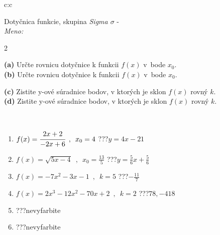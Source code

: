 \documentclass[10pt]{report}
\begin{document}
\begin{tabular}{c:c}
\begin{minipage}[c][104.5mm][t]{0.5\linewidth}
\begin{center}
\vspace{7mm}
{\huge Dotyčnica funkcie, skupina \textit{Sigma $\sigma$} -}\\[5mm]
\textit{Meno:}\phantom{xxxxxxxxxxxxxxxxxxxxxxxxxxxxxxxxxxxxxxxxxxxxxxxxxxxxxxxxxxxxxxxxx}\\[5mm]
\begin{minipage}{0.95\linewidth}
\begin{center}
{\small \begin{multicols}{2} \raggedright
\textbf{(a)} Určte rovnicu dotyčnice k funkcii \(f(x)\) v~bode \(x_0\). \\[1mm]
\textbf{(b)} Určte rovnicu dotyčnice k funkcii \(f(x)\) v~bode \(x_0\). \par \columnbreak
\textbf{(c)} Zistite y-ové súradnice bodov, v ktorých je sklon \(f(x)\) rovný \(k\). \\[1mm]
\textbf{(d)} Zistite y-ové súradnice bodov, v ktorých je sklon \(f(x)\) rovný \(k\). \\[1mm]
\end{multicols}
}
\end{center}
\end{minipage}
\\[4mm]
\begin{minipage}{0.79\linewidth}
\begin{center}
\begin{varwidth}{\linewidth}
\begin{enumerate}
\normalsizerr
\item $f(x)=\cfrac{2x+2}{-2x+6}\enspace , \enspace x_0=4$\quad \dotfill\; ???\;\dotfill \quad $y = 4x-21$
\item $f(x)=\sqrt{5x-4}\enspace , \enspace x_0=\frac{13}{5}$\quad \dotfill\; ???\;\dotfill \quad $y = \frac{5}{6}x+\frac{5}{6}$
\item $f(x)=-7x^2-3x-1\enspace , \enspace k=5$\quad \dotfill\; ???\;\dotfill \quad $-\frac{11}{7}$
\item $f(x)=2x^3-12x^2-70x+2\enspace , \enspace k=2$\quad \dotfill\; ???\;\dotfill \quad $78 , -418$
\item \quad \dotfill\; ???\;\dotfill \quad nevyfarbite
\item \quad \dotfill\; ???\;\dotfill \quad nevyfarbite
\end{enumerate}
\end{varwidth}

\end{center}
\end{minipage}
\end{center}
\end{minipage}
\end{tabular}
\end{document}
